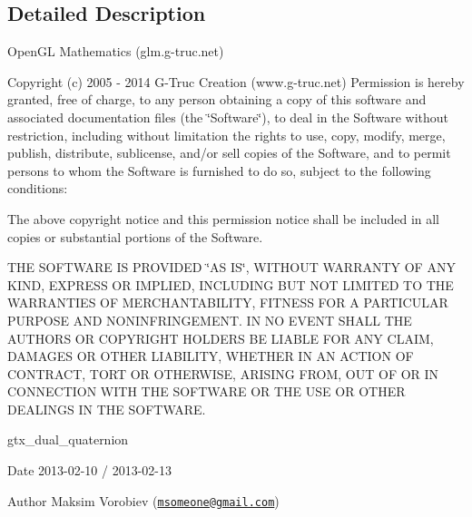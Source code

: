 \subsection{Detailed Description}
Open\-G\-L Mathematics (glm.\-g-\/truc.\-net)

Copyright (c) 2005 -\/ 2014 G-\/\-Truc Creation (www.\-g-\/truc.\-net) Permission is hereby granted, free of charge, to any person obtaining a copy of this software and associated documentation files (the \char`\"{}\-Software\char`\"{}), to deal in the Software without restriction, including without limitation the rights to use, copy, modify, merge, publish, distribute, sublicense, and/or sell copies of the Software, and to permit persons to whom the Software is furnished to do so, subject to the following conditions\-:

The above copyright notice and this permission notice shall be included in all copies or substantial portions of the Software.

T\-H\-E S\-O\-F\-T\-W\-A\-R\-E I\-S P\-R\-O\-V\-I\-D\-E\-D \char`\"{}\-A\-S I\-S\char`\"{}, W\-I\-T\-H\-O\-U\-T W\-A\-R\-R\-A\-N\-T\-Y O\-F A\-N\-Y K\-I\-N\-D, E\-X\-P\-R\-E\-S\-S O\-R I\-M\-P\-L\-I\-E\-D, I\-N\-C\-L\-U\-D\-I\-N\-G B\-U\-T N\-O\-T L\-I\-M\-I\-T\-E\-D T\-O T\-H\-E W\-A\-R\-R\-A\-N\-T\-I\-E\-S O\-F M\-E\-R\-C\-H\-A\-N\-T\-A\-B\-I\-L\-I\-T\-Y, F\-I\-T\-N\-E\-S\-S F\-O\-R A P\-A\-R\-T\-I\-C\-U\-L\-A\-R P\-U\-R\-P\-O\-S\-E A\-N\-D N\-O\-N\-I\-N\-F\-R\-I\-N\-G\-E\-M\-E\-N\-T. I\-N N\-O E\-V\-E\-N\-T S\-H\-A\-L\-L T\-H\-E A\-U\-T\-H\-O\-R\-S O\-R C\-O\-P\-Y\-R\-I\-G\-H\-T H\-O\-L\-D\-E\-R\-S B\-E L\-I\-A\-B\-L\-E F\-O\-R A\-N\-Y C\-L\-A\-I\-M, D\-A\-M\-A\-G\-E\-S O\-R O\-T\-H\-E\-R L\-I\-A\-B\-I\-L\-I\-T\-Y, W\-H\-E\-T\-H\-E\-R I\-N A\-N A\-C\-T\-I\-O\-N O\-F C\-O\-N\-T\-R\-A\-C\-T, T\-O\-R\-T O\-R O\-T\-H\-E\-R\-W\-I\-S\-E, A\-R\-I\-S\-I\-N\-G F\-R\-O\-M, O\-U\-T O\-F O\-R I\-N C\-O\-N\-N\-E\-C\-T\-I\-O\-N W\-I\-T\-H T\-H\-E S\-O\-F\-T\-W\-A\-R\-E O\-R T\-H\-E U\-S\-E O\-R O\-T\-H\-E\-R D\-E\-A\-L\-I\-N\-G\-S I\-N T\-H\-E S\-O\-F\-T\-W\-A\-R\-E.

gtx\-\_\-dual\-\_\-quaternion

\begin{DoxyDate}{Date}
2013-\/02-\/10 / 2013-\/02-\/13 
\end{DoxyDate}
\begin{DoxyAuthor}{Author}
Maksim Vorobiev (\href{mailto:msomeone@gmail.com}{\tt msomeone@gmail.\-com}) 
\end{DoxyAuthor}
